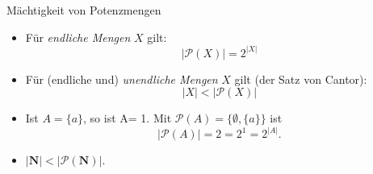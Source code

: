 \documentclass[12pt,ngerman,a4paper,ignorenonframetext,]{beamer}
\providecommand{\tightlist}{%
  \setlength{\itemsep}{0pt}\setlength{\parskip}{0pt}}
\begin{document}
\begin{frame}{Mächtigkeit von Potenzmengen}
\protect\hypertarget{machtigkeit-von-potenzmengen}{}


\begin{Satz}

\begin{itemize}
\tightlist
\item
  Für \emph{endliche Mengen} \(X\) gilt: \begin{equation*}
        |\mathcal{P}(X)| = 2^{|X|}
    \end{equation*}
\item
  Für (endliche und) \emph{unendliche Mengen} \(X\) gilt (der Satz von
  Cantor): \begin{equation*}
        |X| < |\mathcal{P}(X)|
    \end{equation*}
\end{itemize}

\end{Satz}


\begin{Beispiele}[]

\begin{itemize}
\tightlist
\item
  Ist \(A=\{a\}\), so ist \textbar{}A\textbar{}= 1. Mit
  \(\mathcal{P}(A)=\{\emptyset, \{a\}\}\) ist \begin{equation*}
        |\mathcal{P}(A)|=2 = 2^1 = 2^{|A|}.
    \end{equation*}
\item
  \(|\mathbf{N}| < |\mathcal{P}(\mathbf{N})|\).
\end{itemize}

\end{Beispiele}

\end{frame}
\end{document}
